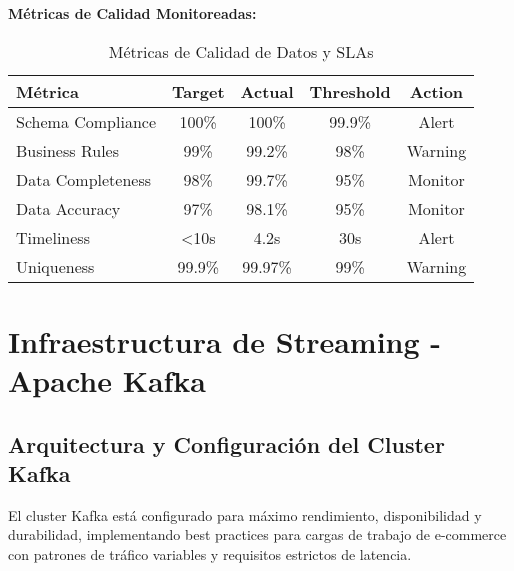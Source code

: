 \textbf{Métricas de Calidad Monitoreadas:}

\begin{table}[H]
\centering
\caption{Métricas de Calidad de Datos y SLAs}
\label{tab:quality_metrics}
\renewcommand{\arraystretch}{1.2}
\begin{tabular}{@{}l|c|c|c|c@{}}
\toprule
\textbf{Métrica} & \textbf{Target} & \textbf{Actual} & \textbf{Threshold} & \textbf{Action} \\
\midrule
Schema Compliance & 100\% & 100\% & 99.9\% & Alert \\
Business Rules & 99\% & 99.2\% & 98\% & Warning \\
Data Completeness & 98\% & 99.7\% & 95\% & Monitor \\
Data Accuracy & 97\% & 98.1\% & 95\% & Monitor \\
Timeliness & <10s & 4.2s & 30s & Alert \\
Uniqueness & 99.9\% & 99.97\% & 99\% & Warning \\
\bottomrule
\end{tabular}
\end{table}

\section{Infraestructura de Streaming - Apache Kafka}
\label{sec:kafka}

\subsection{Arquitectura y Configuración del Cluster Kafka}
\label{subsec:kafka_cluster}

El cluster Kafka está configurado para máximo rendimiento, disponibilidad y durabilidad, implementando best practices para cargas de trabajo de e-commerce con patrones de tráfico variables y requisitos estrictos de latencia.

\vspace{0.3cm}

